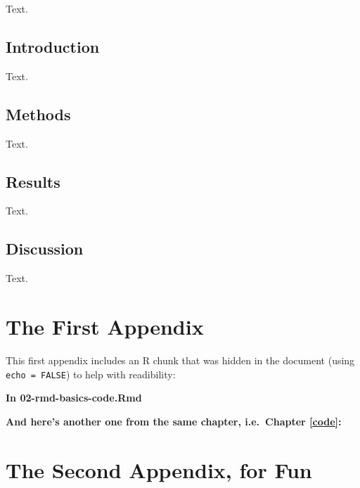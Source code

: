 \documentclass[a4paper, nobind]{templates/ociamthesis}
\newcommand*{\bibtitle}{Works Cited}
\begin{document}
Text.

\hypertarget{introduction-5}{%
\section{Introduction}\label{introduction-5}}

Text.

\hypertarget{methods-4}{%
\section{Methods}\label{methods-4}}

Text.

\hypertarget{results-4}{%
\section{Results}\label{results-4}}

Text.

\hypertarget{discussion-4}{%
\section{Discussion}\label{discussion-4}}

Text.

\startappendices

\hypertarget{the-first-appendix}{%
\chapter{The First Appendix}\label{the-first-appendix}}

This first appendix includes an R chunk that was hidden in the document (using \texttt{echo\ =\ FALSE}) to help with readibility:

\textbf{In 02-rmd-basics-code.Rmd}

\textbf{And here's another one from the same chapter, i.e.~Chapter \ref{code}:}

\hypertarget{the-second-appendix-for-fun}{%
\chapter{The Second Appendix, for Fun}\label{the-second-appendix-for-fun}}


\setlength{\baselineskip}{0pt} %

{\renewcommand*\MakeUppercase[1]{#1}%
\printbibliography[heading=bibintoc,title={\bibtitle}]}
\end{document}
